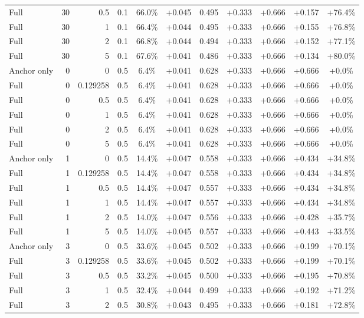 \begin{table}[htbp]
\begin{tabular}{lrrrccccccc}
Full & 30 & 0.5 & 0.1 & 66.0\% & +0.045 & 0.495 & +0.333 & +0.666 & +0.157 & +76.4\% \\
Full & 30 & 1 & 0.1 & 66.4\% & +0.044 & 0.495 & +0.333 & +0.666 & +0.155 & +76.8\% \\
Full & 30 & 2 & 0.1 & 66.8\% & +0.044 & 0.494 & +0.333 & +0.666 & +0.152 & +77.1\% \\
Full & 30 & 5 & 0.1 & 67.6\% & +0.041 & 0.486 & +0.333 & +0.666 & +0.134 & +80.0\% \\
Anchor only & 0 & 0 & 0.5 & 6.4\% & +0.041 & 0.628 & +0.333 & +0.666 & +0.666 & +0.0\% \\
Full & 0 & 0.129258 & 0.5 & 6.4\% & +0.041 & 0.628 & +0.333 & +0.666 & +0.666 & +0.0\% \\
Full & 0 & 0.5 & 0.5 & 6.4\% & +0.041 & 0.628 & +0.333 & +0.666 & +0.666 & +0.0\% \\
Full & 0 & 1 & 0.5 & 6.4\% & +0.041 & 0.628 & +0.333 & +0.666 & +0.666 & +0.0\% \\
Full & 0 & 2 & 0.5 & 6.4\% & +0.041 & 0.628 & +0.333 & +0.666 & +0.666 & +0.0\% \\
Full & 0 & 5 & 0.5 & 6.4\% & +0.041 & 0.628 & +0.333 & +0.666 & +0.666 & +0.0\% \\
Anchor only & 1 & 0 & 0.5 & 14.4\% & +0.047 & 0.558 & +0.333 & +0.666 & +0.434 & +34.8\% \\
Full & 1 & 0.129258 & 0.5 & 14.4\% & +0.047 & 0.558 & +0.333 & +0.666 & +0.434 & +34.8\% \\
Full & 1 & 0.5 & 0.5 & 14.4\% & +0.047 & 0.557 & +0.333 & +0.666 & +0.434 & +34.8\% \\
Full & 1 & 1 & 0.5 & 14.4\% & +0.047 & 0.557 & +0.333 & +0.666 & +0.434 & +34.8\% \\
Full & 1 & 2 & 0.5 & 14.0\% & +0.047 & 0.556 & +0.333 & +0.666 & +0.428 & +35.7\% \\
Full & 1 & 5 & 0.5 & 14.0\% & +0.045 & 0.557 & +0.333 & +0.666 & +0.443 & +33.5\% \\
Anchor only & 3 & 0 & 0.5 & 33.6\% & +0.045 & 0.502 & +0.333 & +0.666 & +0.199 & +70.1\% \\
Full & 3 & 0.129258 & 0.5 & 33.6\% & +0.045 & 0.502 & +0.333 & +0.666 & +0.199 & +70.1\% \\
Full & 3 & 0.5 & 0.5 & 33.2\% & +0.045 & 0.500 & +0.333 & +0.666 & +0.195 & +70.8\% \\
Full & 3 & 1 & 0.5 & 32.4\% & +0.044 & 0.499 & +0.333 & +0.666 & +0.192 & +71.2\% \\
Full & 3 & 2 & 0.5 & 30.8\% & +0.043 & 0.495 & +0.333 & +0.666 & +0.181 & +72.8\% \\

\end{tabular}
\end{table}
